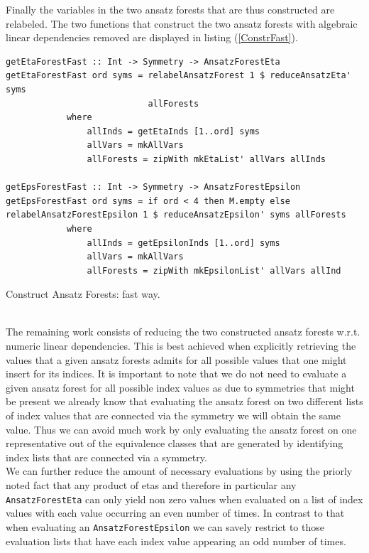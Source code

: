 \documentclass[a4paper,12pt, DIV=14, BCOR=5mm, twoside, headsepline, numbers=noenddot]{scrbook}
\begin{document}
Finally the variables in the two ansatz forests that are thus constructed are relabeled. The two functions that construct the two ansatz forests with algebraic linear dependencies removed are displayed in listing (\ref{ConstrFast}).
\begin{listing}[hbt!]
\begin{verbatim}
getEtaForestFast :: Int -> Symmetry -> AnsatzForestEta
getEtaForestFast ord syms = relabelAnsatzForest 1 $ reduceAnsatzEta' syms 
                            allForests
            where
                allInds = getEtaInds [1..ord] syms
                allVars = mkAllVars
                allForests = zipWith mkEtaList' allVars allInds

getEpsForestFast :: Int -> Symmetry -> AnsatzForestEpsilon
getEpsForestFast ord syms = if ord < 4 then M.empty else
relabelAnsatzForestEpsilon 1 $ reduceAnsatzEpsilon' syms allForests
            where
                allInds = getEpsilonInds [1..ord] syms
                allVars = mkAllVars
                allForests = zipWith mkEpsilonList' allVars allInd
\end{verbatim} 
\caption{Construct Ansatz Forests: fast way.}\label{ConstrFast}
\end{listing}\\

The remaining work consists of reducing the two constructed ansatz forests w.r.t. numeric linear dependencies. This is best achieved when explicitly retrieving the values that a given ansatz forests admits for all possible values that one might insert for its indices. It is important to note that we do not need to evaluate a given ansatz forest for all possible index values as due to symmetries that might be present we already know that evaluating the ansatz forest on two different lists of index values that are connected via the symmetry we will obtain the same value. Thus we can avoid much work by only evaluating the ansatz forest on one representative out of the equivalence classes that are generated by identifying index lists that are connected via a symmetry. \\

We can further reduce the amount of necessary evaluations by using the priorly noted fact that any product of etas and therefore in particular any \texttt{AnsatzForestEta} can only yield non zero values when evaluated on a list of index values with each value occurring an even number of times. In contrast to that when evaluating an \texttt{AnsatzForestEpsilon} we can savely restrict to those evaluation lists that have each index value appearing an odd number of times.\\
\end{document}
